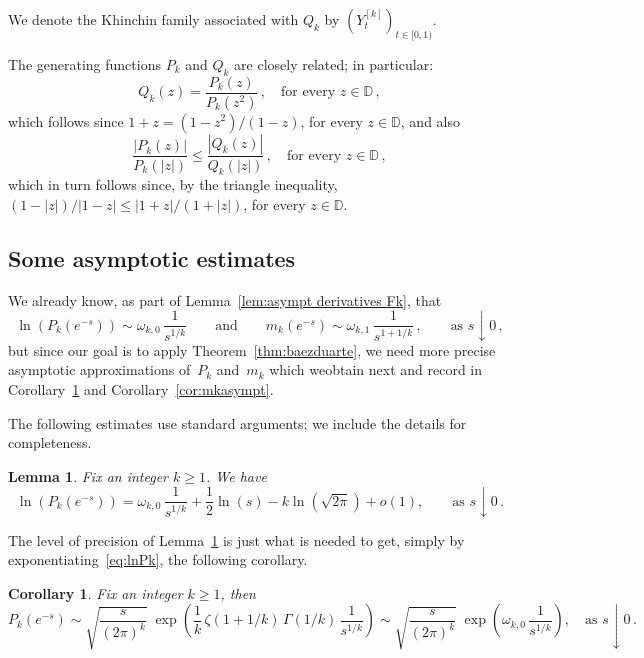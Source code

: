 \documentclass[12pt]{amsart}
\newtheorem{lemma}{Lemma}[section]
\newtheorem{corollary}{Corollary}[section]
\theoremstyle{definition}
\begin{document}
We denote the Khinchin family associated with $Q_k$ by $(Y_{t}^{[k]})_{t \in [0,1)}$.

\smallskip

The generating functions $P_k$ and $Q_k$ are closely related; in particular:
\begin{equation}\label{eq:QkPkrelation}Q_k(z)=\frac{P_k(z)}{P_k(z^2)}\, , \quad \mbox{for every $z \in \mathbb{D}$}\,,\end{equation}
which follows since $1+z=(1-z^2)/(1-z)$, for every $z \in \mathbb{D}$,
and also
\begin{equation}\label{eq:bound from Q_k to P_k}
\frac{|P_k(z)|}{P_k(|z|)}\le
\frac{|Q_k(z)|}{Q_k(|z|)}\, , \quad \mbox{for every $z \in \mathbb{D}$}\,,\end{equation}
which in turn follows since, by the triangle inequality,
$(1-|z|)/|1-z|\le |1+z|/(1+|z|)$, for every $z \in \mathbb{D}$.


\subsection{Some asymptotic estimates}\label{subsec:asymptest}

We already know, as part of Lemma~\ref{lem:asympt derivatives Fk}, that
\[
\ln(P_k(e^{-s})) \sim \omega_{k,0}\,\frac{1}{s^{1/k}} \qquad \text{and} \qquad m_k(e^{-s}) \sim \omega_{k,1}\,\frac{1}{s^{1+1/k}}\,, \qquad \text{as } s\downarrow 0\,,
\]
but since our goal is to apply Theorem~\ref{thm:baezduarte}, we need more precise asymptotic approximations of~$P_k$ and~$m_k$ which weobtain next and record in Corollary~\ref{cor:Pkasympt} and Corollary~\ref{cor:mkasympt}.
\smallskip

The following estimates use standard arguments; we include the details for completeness.

\begin{lemma}\label{lem:lnPk}
Fix an integer $k\ge 1$. We have
\begin{equation}\label{eq:lnPk}
\ln(P_k(e^{-s})) = \omega_{k,0}\,\frac{1}{s^{1/k}} + \frac{1}{2}\ln(s) - k\ln(\sqrt{2\pi}) + o(1), \qquad \text{as } s\downarrow 0\,.
\end{equation}
\end{lemma}

The level of precision of Lemma~\ref{lem:lnPk} is just what is needed to get, simply by exponentiating~\eqref{eq:lnPk}, the following corollary.

\begin{corollary}\label{cor:Pkasympt}
Fix an integer $k\ge 1$, then
\[
P_k(e^{-s}) \sim \sqrt{\frac{s}{(2\pi)^k}}\;\exp\!\left(\frac{1}{k}\,\zeta(1+1/k)\,\Gamma(1/k)\,\frac{1}{s^{1/k}}\right) \sim \sqrt{\frac{s}{(2\pi)^k}}\;\exp\!\left(\omega_{k,0}\,\frac{1}{s^{1/k}}\right), \quad \text{as } s\downarrow 0\,.
\]
\end{corollary}
\end{document}
